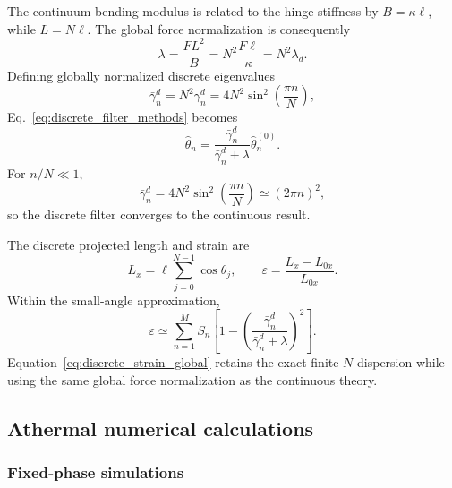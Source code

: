\documentclass[pdflatex, twocolumn, sn-nature]{sn-jnl}
\begin{document}
The continuum bending modulus is related to the hinge stiffness by $B=\kappa\ell$, while $L=N\ell$. The global force normalization is consequently
\begin{equation}
\lambda
=
\frac{FL^2}{B}
=
N^2\frac{F\ell}{\kappa}
=
N^2\lambda_d.
\label{eq:lambda_mapping_methods}
\end{equation}
Defining globally normalized discrete eigenvalues
\begin{equation}
\bar\gamma_n^d
=
N^2\gamma_n^d
=
4N^2\sin^2\left(\frac{\pi n}{N}\right),
\label{eq:global_discrete_eigenvalue}
\end{equation}
Eq.~\eqref{eq:discrete_filter_methods} becomes
\begin{equation}
\widehat{\theta}_n
=
\frac{\bar\gamma_n^d}
{\bar\gamma_n^d+\lambda}
\widehat{\theta}_n^{(0)}.
\label{eq:global_discrete_filter}
\end{equation}
For $n/N\ll1$,
\begin{equation}
\bar\gamma_n^d
=
4N^2\sin^2\left(\frac{\pi n}{N}\right)
\simeq
(2\pi n)^2,
\end{equation}
so the discrete filter converges to the continuous result.

The discrete projected length and strain are
\begin{equation}
L_x
=
\ell\sum_{j=0}^{N-1}\cos\theta_j,
\qquad
\varepsilon
=
\frac{L_x-L_{0x}}{L_{0x}}.
\end{equation}
Within the small-angle approximation,
\begin{equation}
\varepsilon
\simeq
\sum_{n=1}^{M}
S_n
\left[
1-
\left(
\frac{\bar\gamma_n^d}
{\bar\gamma_n^d+\lambda}
\right)^2
\right].
\label{eq:discrete_strain_global}
\end{equation}
Equation~\eqref{eq:discrete_strain_global} retains the exact finite-$N$ dispersion while using the same global force normalization as the continuous theory.

\subsection*{Athermal numerical calculations}
\label{sec:numerical_methods}

\subsubsection*{Fixed-phase simulations}
\end{document}
